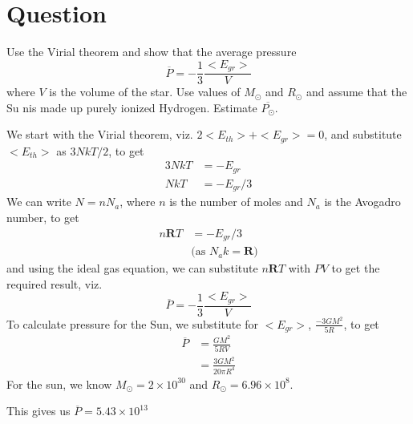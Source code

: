 \documentclass[paper=a4, fontsize=11pt]{scrartcl} %
\numberwithin{equation}{section} %
\numberwithin{figure}{section} %
\numberwithin{table}{section} %
\begin{document}
\section{Question}
	Use the Virial theorem and show that the average pressure
	\begin{equation}
		\overline{P} = - \frac{1}{3}\frac{<E_{gr}>}{V}
	\end{equation}
	where $V$ is the volume of the star. Use values of $M_\odot$ and $R_\odot$ and assume that the Su nis made up purely ionized Hydrogen. Estimate $\overline{P_\odot}$.\\
	\par
	We start with the Virial theorem, viz. $2<E_{th}> + <E_{gr}> = 0$, and substitute $<E_{th}>$ as $3NkT/2$, to get
	\begin{equation}
		\begin{split}
			3NkT & = - E_{gr}\\
			NkT & = - E_{gr}/3			
		\end{split}
	\end{equation}
	We can write $N=nN_a$, where $n$ is the number of moles and $N_a$ is the Avogadro number, to get
	\begin{equation}
		\begin{split}
			n\mathbf{R}T & = - E_{gr}/3\\
			& \text{(as $N_ak=\mathbf{R}$)}
		\end{split}
	\end{equation}
	and using the ideal gas equation, we can substitute $n\mathbf{R}T$ with $PV$ to get the required result, viz.
	\begin{equation}
		\overline{P} = - \frac{1}{3}\frac{<E_{gr}>}{V}
	\end{equation}
	To calculate pressure for the Sun, we substitute for $<E_{gr}>$, $\frac{-3GM^2}{5R}$, to get
	\begin{equation}
	\begin{split}
		\overline{P} 	& = \frac{GM^2}{5RV} \\
		 				& = \frac{3GM^{2}}{20 \pi R^4}
	\end{split} 			
	\end{equation}
	For the sun, we know $M_\odot = 2 \times 10^{30}$ and $R_\odot=6.96 \times 10^8$.
	\par 
	This gives us $\overline{P}=5.43 \times 10^{13}$
\end{document}
